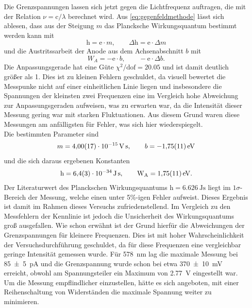 Die Grenzspannungen lassen sich jetzt gegen die Lichtfrequenz auftragen, die mit
der Relation $\nu = \mathrm c / \lambda$ berechnet wird. Aus \cref{eq:gegenfeldmethode} lässt sich
ablesen, dass aus der Steigung $m$ das Plancksche Wirkungsquantum bestimmt werden kann mit
\begin{equation}
	\mathrm h = \mathrm e \cdot m,\qquad \Delta\mathrm h = \mathrm e \cdot \Delta m \nonumber
\end{equation}
und die Austritssarbeit der Anode aus dem Achsenabschnitt $b$ mit
\begin{equation}
	W_A = -\mathrm e \cdot b, \qquad -\mathrm e \cdot \Delta b . \nonumber
\end{equation}
Die Anpassungsgerade hat eine Güte $\chi^2/\mathrm{dof} = \num{20.05}$ und ist damit deutlich größer als
\num{1}. Dies ist zu kleinen Fehlern geschuldet, da visuell bewertet die Messpunke nicht auf einer
einheitlichen Linie liegen und insbesondere die Spannungen der kleinsten zwei Frequenzen eine im Vergleich
hohe Abweichung zur Anpassungsgeraden aufweisen, was zu erwarten war, da die Intensität
dieser Messung gering war mit starken Fluktuationen. Aus diesem Grund waren diese Messungen
am anfälligsten für Fehler, was sich hier wiederspiegelt.\\
Die bestimmten Parameter sind
\[m = \SI{4.00(17)e-15}{\volt\second},\qquad b = -\SI{1.75\pm .11}{\electronvolt}\]
und die sich daraus ergebenen Konstanten
\[\mathrm h = \SI{6.4(3)e-34}{\joule\second}, \qquad \mathrm W_{\mathrm A} = \SI{1.75\pm .11}{\electronvolt} .\]
Der Literaturwert des Planckschen Wirkungsquantums $\mathrm h = \SI{6.626}{\joule\second}$
liegt im $1\sigma$-Bereich der Messung, welche einen unter 5\%-igen Fehler aufweist.
Dieses Ergebnis ist damit im Rahmen dieses Versuchs zufriedenstellend. Im Vergleich 
zu den Messfehlern der Kennlinie ist jedoch die Unsicherheit des Wirkungsquantums 
groß ausgefallen. Wie schon erwähnt ist der Grund hierfür die Abweichungen 
der Grenzspannungen für kleinere Frequenzen. Dies ist mit hoher Wahrscheinlichkeit der 
Versuchsdurchführung geschuldet, da für diese Frequenzen eine vergleichbar geringe 
Intensität gemessen wurde. Für \SI{578}{\nano\meter} lag die maximale Messung bei \SI{85\pm 5}{\pico\ampere}
und die Grenzspannung wurde schon bei etwa \SI{370\pm 10}{\milli\volt} erreicht, obwohl
am Spannungsteiler ein Maximum von \SI{2.77}{\volt} eingestellt war.
Um die Messung empflindlicher einzustellen, hätte es sich angeboten, mit einer 
Reihenschaltung von Widerständen die maximale Spannung weiter zu minimieren.\\

